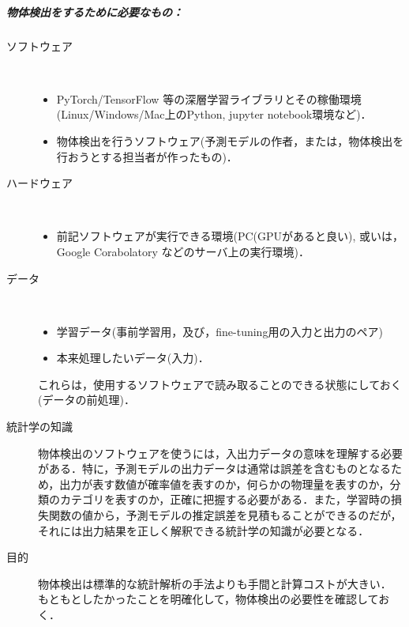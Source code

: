 \documentclass[twocolumn]{jsarticle} %
\begin{document}
\subparagraph{物体検出をするために必要なもの：}
\begin{description}
    \item[ソフトウェア]　
    \begin{itemize}
        \item PyTorch/TensorFlow 等の深層学習ライブラリとその稼働環境(Linux/Windows/Mac上のPython, jupyter notebook環境など)．
        \item 物体検出を行うソフトウェア(予測モデルの作者，または，物体検出を行おうとする担当者が作ったもの)．
    \end{itemize}
    \item[ハードウェア]　
    \begin{itemize}
        \item 前記ソフトウェアが実行できる環境(PC(GPUがあると良い), 或いは，Google Corabolatory などのサーバ上の実行環境)．
    \end{itemize}
    \item[データ]　
    \begin{itemize}
        \item 学習データ(事前学習用，及び，fine-tuning用の入力と出力のペア)
        \item 本来処理したいデータ(入力)．
    \end{itemize}
    これらは，使用するソフトウェアで読み取ることのできる状態にしておく(データの前処理)．

    \item[統計学の知識] 物体検出のソフトウェアを使うには，入出力データの意味を理解する必要がある．特に，予測モデルの出力データは通常は誤差を含むものとなるため，出力が表す数値が確率値を表すのか，何らかの物理量を表すのか，分類のカテゴリを表すのか，正確に把握する必要がある．また，学習時の損失関数の値から，予測モデルの推定誤差を見積もることができるのだが，それには出力結果を正しく解釈できる統計学の知識が必要となる．

    \item[目的] 
    物体検出は標準的な統計解析の手法よりも手間と計算コストが大きい．
    もともとしたかったことを明確化して，物体検出の必要性を確認しておく．
\end{description}

\end{document}
